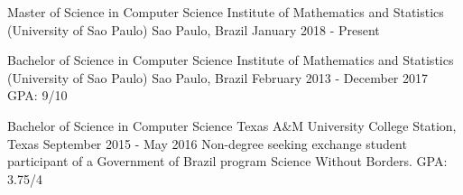 \documentclass[11pt, a4paper]{awesome-cv-res}
\begin{document}
\makecvheader
\makecvfooter
  {}
  {}
  {\thepage}



\begin{cventries}
\cventry
{Master of Science in Computer Science}
{Institute of Mathematics and Statistics (University of Sao Paulo)} %
{Sao Paulo, Brazil} %
{January 2018 - Present}
{}
\vspace{-1em}

\cventry
{Bachelor of Science in Computer Science} %
{Institute of Mathematics and Statistics (University of Sao Paulo)} %
{Sao Paulo, Brazil} %
{February 2013 - December 2017} %
{GPA: 9/10}
\newline

\cventry
{Bachelor of Science in Computer Science}
{Texas A\&M University}
{College Station, Texas}
{September 2015 - May 2016}
{Non-degree seeking exchange student participant of a Government of Brazil program Science Without Borders. \newline GPA: 3.75/4}
\end{cventries}
\end{document}
